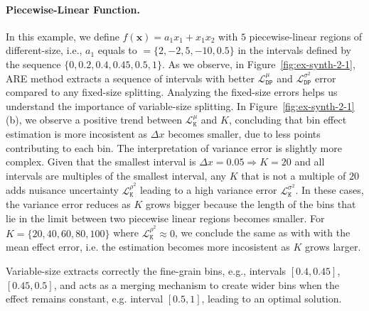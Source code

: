 \documentclass[twoside]{article}
\begin{document}
\paragraph{Piecewise-Linear Function.}

In this example, we define \(f(\mathbf{x}) = a_1x_1 + x_1x_2\) with
\(5\) piecewise-linear regions of different-size, i.e., \(a_1\) equals
to \(=\{2, -2, 5, -10, 0.5\}\) in the intervals defined by the
sequence \(\{0, 0.2, 0.4, 0.45, 0.5, 1\}\). As we observe, in
Figure~\ref{fig:ex-synth-2-1}, ARE method extracts a sequence of
intervals with better \(\mathcal{L}_{\mathtt{DP}}^{\mu}\) and
\(\mathcal{L}_{\mathtt{DP}}^{\sigma^2}\) error compared to any
fixed-size splitting. Analyzing the fixed-size errors helps us
understand the importance of variable-size splitting. In
Figure~\ref{fig:ex-synth-2-1}(b), we observe a positive trend between
\(\mathcal{L}^{\mu}_{\mathtt{K}}\) and \(K\), concluding that bin
effect estimation is more incosistent as \(\Delta x\) becomes smaller,
due to less points contributing to each bin. The interpretation of
variance error is slightly more complex. Given that the smallest
interval is \(\Delta x = 0.05 \Rightarrow K = 20\) and all intervals
are multiples of the smallest interval, any \(K\) that is not a
multiple of \(20\) adds nuisance uncertainty
\(\mathcal{L}^{\rho^2}_{\mathtt{K}}\) leading to a high variance error
\(\mathcal{L}^{\sigma^2}_{\mathtt{K}}\). In these cases, the variance
error reduces as \(K\) grows bigger because the length of the bins
that lie in the limit between two piecewise linear regions becomes
smaller. For \(K=\{20, 40, 60, 80, 100\}\) where
\(\mathcal{L}^{\rho^2}_{\mathtt{K}} \approx 0\), we conclude the same
as with with the mean effect error, i.e. the estimation becomes more
incosistent as \(K\) grows larger.

Variable-size extracts correctly the fine-grain bins, e.g., intervals
\([0.4, 0.45]\), \([0.45, 0.5]\), and acts as a merging mechanism to
create wider bins when the effect remains constant, e.g. interval
\([0.5, 1]\), leading to an optimal solution.
\end{document}
